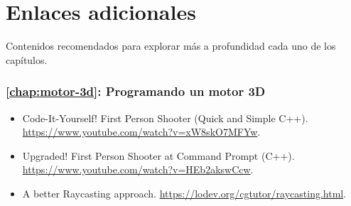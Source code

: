 \chapter{Enlaces adicionales}
\label{chap:enlaces}

Contenidos recomendados para explorar más a profundidad cada uno de los capítulos.

\subsection*{\autoref{chap:motor-3d}: Programando un motor 3D}

\begin{itemize}
\item Code-It-Yourself! First Person Shooter (Quick and Simple C++). \url{https://www.youtube.com/watch?v=xW8skO7MFYw}.

\item Upgraded! First Person Shooter at Command Prompt (C++). \url{https://www.youtube.com/watch?v=HEb2akswCcw}.

\item A better Raycasting approach. \url{https://lodev.org/cgtutor/raycasting.html}.
\end{itemize}

